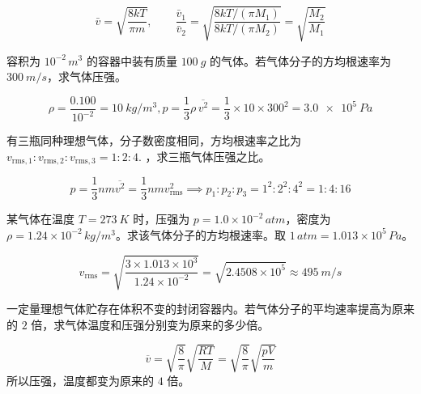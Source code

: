 \documentclass[lang=cn,11pt]{elegantbook}
\begin{document}
\begin{solution}
 \[\bar v=\sqrt{\frac{8kT}{\pi m}},\qquad \frac{\bar v_1}{\bar v_2} =\sqrt{\frac{8kT/(\pi M_1)}{8kT/(\pi M_2)}} =\sqrt{\frac{M_2}{M_1}}\] 
\end{solution}

\begin{exercise}
容积为 \(10^{-2}\,\si{m^3}\) 的容器中装有质量 \(\SI{100}{g}\) 的气体。若气体分子的方均根速率为 \(\SI{300}{m/s}\)，求气体压强。
\end{exercise}

\begin{solution}
 \[\rho=\frac{0.100}{10^{-2}}=\SI{10}{kg/m^3},p=\frac13\rho\,\overline{v^2}=\frac13\times 10\times 300^2 =\SI{3.0e5}{Pa}\]
\end{solution}

\begin{exercise}
有三瓶同种理想气体，分子数密度相同，方均根速率之比为 \(v_{\mathrm{rms},1}:v_{\mathrm{rms},2}:v_{\mathrm{rms},3}=1:2:4.\) ，求三瓶气体压强之比。
\end{exercise}

\begin{solution}
 \[p=\frac13 nm\overline{v^2} =\frac13nmv_{\mathrm{rms}}^2\implies p_1:p_2:p_3 =1^2:2^2:4^2 =1:4:16\]
\end{solution}

\begin{exercise}
某气体在温度 \(T=\SI{273}{K}\) 时，压强为 \(p=1.0\times10^{-2}\,\si{atm}\)，密度为 \(\rho=1.24\times10^{-2}\,\si{kg/m^3}\)。求该气体分子的方均根速率。取 \(1\,\si{atm}=1.013\times10^5\,\si{Pa}\)。
\end{exercise}

\begin{solution}
\[v_{\mathrm{rms}} =\sqrt{\frac{3\times1.013\times10^3}{1.24\times10^{-2}}} =\sqrt{2.4508\times10^5} \approx \SI{495}{m/s}\]
\end{solution}

\begin{exercise}
一定量理想气体贮存在体积不变的封闭容器内。若气体分子的平均速率提高为原来的 \(2\) 倍，求气体温度和压强分别变为原来的多少倍。
\end{exercise}

\begin{solution}
\[\overline{v}=\sqrt{\frac{8}{\pi}}\sqrt{\frac{RT}{M}}=\sqrt{\frac{8}{\pi}}\sqrt{\frac{pV}{m}}\]
 所以压强，温度都变为原来的 \(4\) 倍。
\end{solution}
\end{document}
